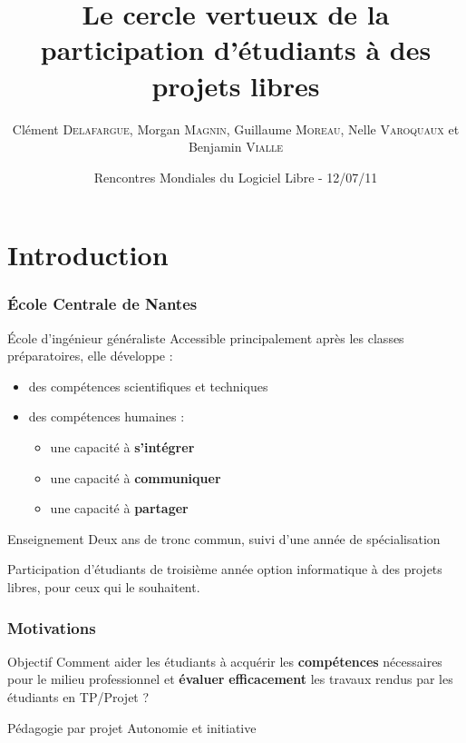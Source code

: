 \documentclass[hyperref,french,usenames,xcolor=dvipsnames]{beamer}
\title[OOo Edu]%
{Le cercle vertueux de la participation d'étudiants à des projets libres}
\author[C. \textsc{Delafargue}, M. \textsc{Magnin}, G. \textsc{Moreau}, N. \textsc{Varoquaux}, B. \textsc{Vialle}]%
{Clément \textsc{Delafargue}, Morgan \textsc{Magnin}, Guillaume \textsc{Moreau}, Nelle \textsc{Varoquaux} et Benjamin \textsc{Vialle}
}
\institute[ECN]{
\structure{
École Centrale de Nantes}
}
\date[12/07/2011]{Rencontres Mondiales du Logiciel Libre - 12/07/11}
\begin{document}
\frame{\titlepage}


\section{Introduction}

\frame
{
  \frametitle{École Centrale de Nantes}

  \begin{block}{École d'ingénieur généraliste}
  Accessible principalement après les classes préparatoires, elle développe :
    \begin{itemize}
      \item des compétences scientifiques et techniques
      \item des compétences humaines :
      \begin{itemize}
                \item une capacité à {\bf s'intégrer}
                \item une capacité à {\bf communiquer}
                \item une capacité à {\bf partager}
      \end{itemize}
    \end{itemize}
  \end{block}
  
  \begin{block}{Enseignement}
        Deux ans de tronc commun, suivi d'une année de spécialisation
  \end{block}
  
  \begin{alertblock}{}
    Participation d'étudiants de troisième année option informatique à des projets libres, pour ceux qui le souhaitent.
  \end{alertblock}
}

\frame
{
  \frametitle{Motivations}

\begin{alertblock}{Objectif}
Comment aider les étudiants à acquérir les \textbf{compétences} nécessaires pour le milieu professionnel et \textbf{évaluer} \textbf{efficacement} les travaux rendus par les étudiants en TP/Projet ?
\end{alertblock}

\begin{block}{Pédagogie par projet}
Autonomie et initiative
\end{block}

}
\end{document}
